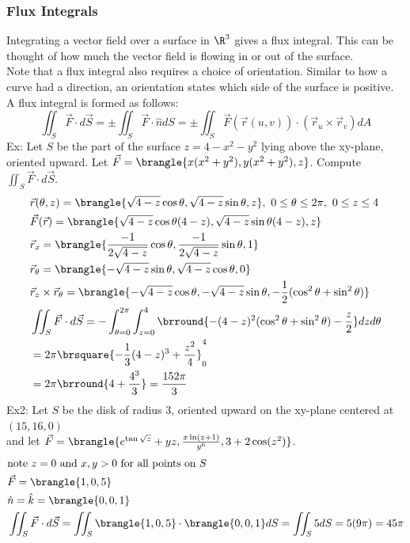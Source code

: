 \subsubsection{Flux Integrals}
Integrating a vector field over a surface in $\R^3$ gives a flux integral. This can be thought of how much the vector field is flowing in or out of the surface.\\
Note that a flux integral also requires a choice of orientation. Similar to how a curve had a direction, an orientation states which side of the surface is positive.\\
A flux integral is formed as follows:
$$\iint_S\vec{F}\cdot d\vec{S}=\pm\iint_S\vec{F}\cdot\hat{n} dS=\pm\iint_S\vec{F}(\vec{r}(u,v))\cdot(\vec{r}_u\times\vec{r}_v)dA$$
Ex: Let $S$ be the part of the surface $z=4-x^2-y^2$ lying above the xy-plane, oriented upward. Let $\vec{F}=\brangle{x(x^2+y^2),y(x^2+y^2),z}$. Compute $\iint_S\vec{F}\cdot d\vec{S}$.
\begin{align*}
    &\vec{r}(\theta,z)=\brangle{\sqrt{4-z}\cos\theta,\sqrt{4-z}\sin\theta,z},\ 0\leq\theta\leq 2\pi,\ 0\leq z\leq 4\\
    &\vec{F}(\vec{r})=\brangle{\sqrt{4-z}\cos\theta(4-z),\sqrt{4-z}\sin\theta(4-z),z}\\
    &\vec{r}_z=\brangle{\frac{-1}{2\sqrt{4-z}}\cos\theta,\frac{-1}{2\sqrt{4-z}}\sin\theta,1}\\
    &\vec{r}_\theta=\brangle{-\sqrt{4-z}\sin\theta,\sqrt{4-z}\cos\theta,0}\\
    &\vec{r}_z\times\vec{r}_\theta=\brangle{-\sqrt{4-z}\cos\theta,-\sqrt{4-z}\sin\theta,-\frac{1}{2}(\cos^2\theta+\sin^2\theta)}\\
    &\iint_S\vec{F}\cdot d\vec{S}=-\int_{\theta=0}^{2\pi}\int_{z=0}^4\brround{-(4-z)^2(\cos^2\theta+\sin^2\theta)-\frac{z}{2}}dzd\theta\\
    &=2\pi\brsquare{-\frac{1}{3}(4-z)^3+\frac{z^2}{4}}_0^4\\
    &=2\pi\brround{4+\frac{4^3}{3}}=\frac{152\pi}{3}
\end{align*}
Ex2: Let $S$ be the disk of radius 3, oriented upward on the xy-plane centered at $(15,16,0)$\\
and let $\vec{F}=\brangle{e^{\tan{\sqrt{z}}}+yz,\frac{x\ln(z+1)}{y^6},3+2\cos(z^2)}$.
\begin{align*}
    &\text{note $z=0$ and $x,y>0$ for all points on $S$}\\
    &\vec{F}=\brangle{1,0,5}\\
    &\hat{n}=\hat{k}=\brangle{0,0,1}\\
    &\iint_S\vec{F}\cdot d\vec{S}=\iint_S\brangle{1,0,5}\cdot\brangle{0,0,1}dS=\iint_S5dS=5(9\pi)=45\pi
\end{align*}
